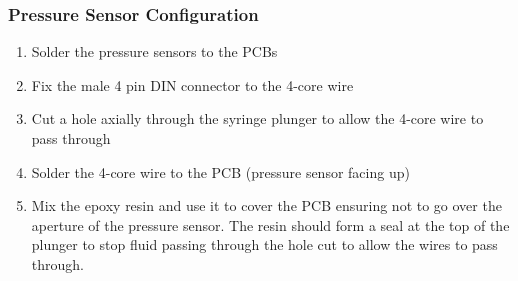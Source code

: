 \subsubsection{Pressure Sensor Configuration}

\begin{enumerate}
    \item Solder the pressure sensors to the PCBs
    \item Fix the male 4 pin DIN connector to the 4-core wire
    \item Cut a hole axially through the syringe plunger to allow the 4-core wire to pass through
    \item Solder the 4-core wire to the PCB (pressure sensor facing up)
    \item Mix the epoxy resin and use it to cover the PCB ensuring not to go over the aperture of the pressure sensor. The resin should form a seal at the top of the plunger to stop fluid passing through the hole cut to allow the wires to pass through.
    
 
  \end{enumerate}